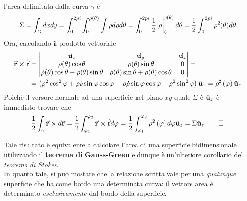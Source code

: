 \begin{demonstration}
	l'area delimitata dalla curva $\gamma$ è
	\begin{equation*}
		\Sigma=\int_{\Sigma}dxdy=\int_{0}^{2pi}\int_{0}^{\rho(\theta)}\int \rho d\rho d\theta= \int_{0}^{2pi}\frac{1}{2}\eval{\rho}_{0}^{\rho(\theta)} d\theta=\frac{1}{2}\int_{0}^{2pi}\rho^2(\theta)d\theta
	\end{equation*}
	Ora, calcolando il prodotto vettoriale 
	\begin{align*}
		\vb*{\va{r}}\cross\dot{\vec{\mathbf{r}}}&=
		\begin{vmatrix}
			\vb*{\va{u}}_x & \vb*{\va{u}}_y & \vb*{\va{u}}_z\\
			\rho(\theta)\cos \theta & \rho(\theta)\sin \theta & 0\\
			\dot{\rho}(\theta)\cos \theta-\rho(\theta)\sin \theta & \dot{\rho}(\theta)\sin \theta+\rho(\theta)\cos \theta & 0
		\end{vmatrix}=\\
	&=\left(\rho^2\cos^2\varphi + \rho \dot{\rho}\sin\varphi\cos\varphi-\rho \dot{\rho}\sin\varphi\cos\varphi+\rho^2\sin^2\varphi\right)\hat{\mathbf{u}}_z=\rho^2\left(\varphi\right)\hat{\mathbf{u}}_z
	\end{align*}
	Poichè il versore normale ad una superficie nel piano $xy$ quale $\Sigma$ è $\hat{\mathbf{u}}_z$ è immediato trovare che
	\begin{equation*}
		\frac{1}{2}\int_{\gamma}\vb*{\va{r}}\cross d\vb*{\va{r}}=\frac{1}{2}\int_{\varphi_1}^{\varphi_2}\vb*{\va{r}}\cross\dot{\vec{\mathbf{r}}}d\varphi=\frac{1}{2}\int_{\varphi_1}^{\varphi_2}\rho^2\left(\varphi\right)d\varphi\hat{\mathbf{u}}_z=\Sigma\hat{\mathbf{u}}_z\qedhere
	\end{equation*} 
\end{demonstration}
\begin{observe} %
	Tale risultato è equivalente a calcolare l'area di una superficie bidimensionale utilizzando il \textbf{teorema di Gauss-Green} e dunque è un'ulteriore corollario del \textit{teorema di Stokes}.\\
	In quanto tale, si può mostare che la relazione scritta vale per una \textit{qualunque} superficie che ha come bordo una determinata curva: il vettore area è determinato \textit{esclusivamente} dal bordo della superficie.
\end{observe}